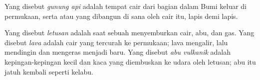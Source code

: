\begin{definition}\label{def:g4:volcanoes-earthquakes-first-look:volcano}
Yang disebut \emph{gunung api} adalah tempat  cair
dari bagian dalam Bumi keluar di permukaan, serta  atau  yang
dibangun di sana oleh  cair itu, lapis demi lapis.
\end{definition}

\begin{definition}\label{def:g4:volcanoes-earthquakes-first-look:eruption}
Yang disebut \emph{letusan} adalah saat sebuah 
menyemburkan  cair, abu, dan gas. Yang disebut \emph{lava}
adalah  cair yang tercurah ke permukaan; lava mengalir, lalu
mendingin dan mengeras menjadi  baru. Yang disebut
\emph{abu vulkanik} adalah kepingan-kepingan kecil
 dan kaca yang diembuskan ke udara oleh letusan; abu itu jatuh
kembali seperti  kelabu.
\end{definition}

